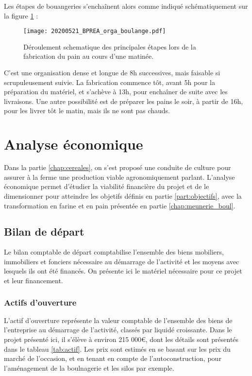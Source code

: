 \documentclass{book}
\begin{document}
Les étapes de bouangeries s'enchaînent alors comme indiqué schématiquement sur la figure \ref{fig:orga_boulange} :

\begin{figure}[h!]
\begin{center}
	\texttt{[image: 20200521\_BPREA\_orga\_boulange.pdf]}
	\caption{Déroulement schematique des principales étapes lors de la fabrication du pain au cours d'une matinée.}
	\label{fig:orga_boulange}
\end{center}
\end{figure}

C'est une organisation dense et longue de 8h successives, mais faisable si scrupuleusement suivie. La fabrication commence tôt, avant 5h pour la préparation du matériel, et s'achève à 13h, pour enchaîner de suite avec les livraisons. Une autre possibilité est de préparer les pains le soir, à partir de 16h, pour les livrer tôt le matin, mais ils ne sont pas chauds.

\chapter{Analyse économique}
\label{part:chap_eco}

Dans la partie \ref{chap:cereales}, on s'est proposé une conduite de culture pour assurer à la ferme une production viable agronomiquement parlant. L'analyse économique permet d'étudier la viabilité financière du projet et de le dimensionner pour atteindre les objetifs définis en partie \ref{part:objectifs}, avec la transformation en farine et en pain présentée en partie \ref{chap:meunerie_boul}.

\section{Bilan de départ}
\label{bilan_ouverture}

Le bilan comptable de départ comptabilise l'ensemble des biens mobiliers, immobiliers et fonciers nécessaire au démarrage de l'activité et les moyens avec lesquels ils ont été financés. On présente ici le matériel nécessaire pour ce projet et leur financement.

\subsection{Actifs d'ouverture}

L'actif d'ouverture représente la valeur comptable de l'ensemble des biens de l'entreprise au démarrage de l'activité, classés par liquidé croissante. Dans le projet présenté ici, il s'élève à environ 215 000\euro{}, dont les détails sont présentés dans le tableau \ref{tab:actif}. Les prix sont estimés en se basant sur les prix du marché de l'occasion, et en tenant en compte de l'autoconstruction, pour l'aménagement de la boulnagerie et les silos par exemple.
\end{document}
